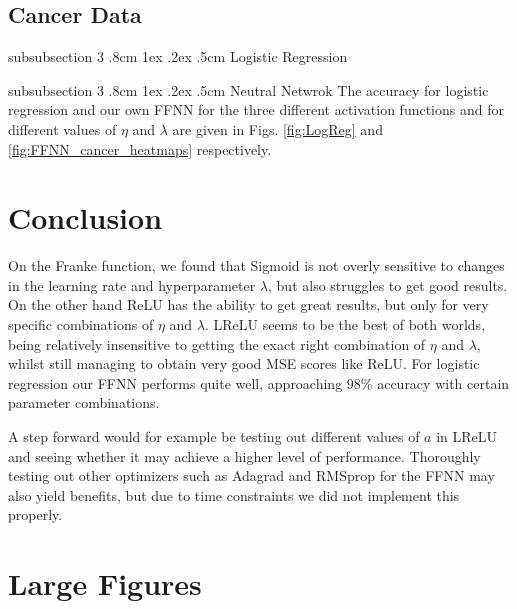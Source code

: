 \documentclass[%
reprint,s
amsmath,amssymb,
aps,
]{revtex4-2}
\makeatletter
\renewcommand{\subsubsection}{%
	\@startsection
	{subsubsection}%
	{3}%
	{\z@}%
	{.8cm \@plus1ex \@minus .2ex}%
	{.5cm}%
	{\normalfont\small\centering}%
}
\makeatother
\begin{document}
\subsection{Cancer Data}
\subsubsection{Logistic Regression}

\subsubsection{Neutral Netwrok}
The accuracy for logistic regression and our own FFNN for the three different activation functions and for different values of $\eta$ and $\lambda$ are given in Figs. \ref{fig:LogReg} and \ref{fig:FFNN_cancer_heatmaps} respectively.

\section{Conclusion}
On the Franke function, we found that Sigmoid is not overly sensitive to changes in the learning rate and hyperparameter $\lambda$, but also struggles to get good results. On the other hand ReLU has the ability to get great results, but only for very specific combinations of $\eta$ and $\lambda$. LReLU seems to be the best of both worlds, being relatively insensitive to getting the exact right combination of $\eta$ and $\lambda$, whilst still managing to obtain very good MSE scores like ReLU.  For logistic regression our FFNN performs quite well, approaching $98\%$ accuracy with certain parameter combinations.

A step forward would for example be testing out different values of $a$ in LReLU and seeing whether it may achieve a higher level of performance. Thoroughly testing out other optimizers such as Adagrad and RMSprop for the FFNN may also yield benefits, but due to time constraints we did not implement this properly. 




\appendix
\section{Large Figures}
\label{Appendix:A}

\end{document}
